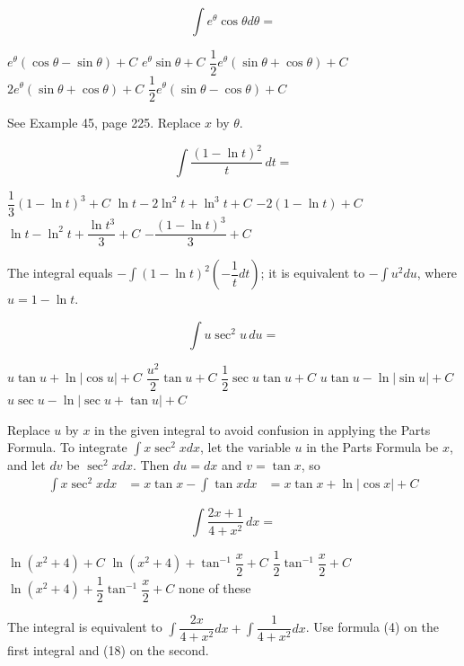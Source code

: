 \question\label{calc05:bc-first}
\[
\displaystyle\int e^{\theta} \cos \theta d \theta=
\]
\begin{choices}
  \choice $e^{\theta}(\cos \theta-\sin \theta)+C$
  \choice $e^{\theta} \sin \theta+C$
  \CorrectChoice $\dfrac{1}{2} e^{\theta}(\sin \theta+\cos \theta)+C$
  \choice $2 e^{\theta}(\sin \theta+\cos \theta)+C$
  \choice $\dfrac{1}{2} e^{\theta}(\sin \theta-\cos \theta)+C$
\end{choices}
\begin{solution}
See Example 45, page 225. Replace $x$ by $\theta$.
\end{solution}

\question
\[
\displaystyle\int \dfrac{(1-\ln t)^{2}}{t} \,dt=
\]
\begin{choices}
  \choice $\dfrac{1}{3}(1-\ln t)^{3}+C$
  \choice $\ln t-2 \ln ^{2} t+\ln ^{3} t+C$
  \choice $-2(1-\ln t)+C$
  \choice $\ln t-\ln ^{2} t+\dfrac{\ln t^{3}}{3}+C$
  \CorrectChoice $-\dfrac{(1-\ln t)^{3}}{3}+C$
\end{choices}
\begin{solution}
The integral equals $-\displaystyle\int(1-\ln t)^{2}\left(-\dfrac{1}{t} d t\right)$; it is equivalent to $-\displaystyle\int u^{2} d u$, where $u=1-\ln t$.
\end{solution}

\question
\[
\displaystyle\int u \sec ^{2} u \,du=
\]
\begin{choices}
  \CorrectChoice $u \tan u+\ln |\cos u|+C$
  \choice $\dfrac{u^{2}}{2} \tan u+C$
  \choice $\dfrac{1}{2} \sec u \tan u+C$
  \choice $u \tan u-\ln |\sin u|+C$
  \choice $u \sec u-\ln |\sec u+\tan u|+C$
\end{choices}
\begin{solution}
Replace $u$ by $x$ in the given integral to avoid confusion in applying the Parts Formula. To integrate $\displaystyle\int x \sec ^{2} x d x$, let the variable $u$ in the Parts Formula be $x$, and let $d v$ be $\sec ^{2} x d x$. Then $d u=d x$ and $v=\tan x$, so
\[
\begin{aligned}
\displaystyle\int x \sec ^{2} x d x & =x \tan x-\displaystyle\int \tan x d x 
& =x \tan x+\ln |\cos x|+C
\end{aligned}
\]
\end{solution}



\newpage





\question
\[
\displaystyle\int \dfrac{2 x+1}{4+x^{2}} \,dx=
\]
\begin{choices}
  \choice $\ln \left(x^{2}+4\right)+C$
  \choice $\ln \left(x^{2}+4\right)+\tan ^{-1} \dfrac{x}{2}+C$
  \choice $\dfrac{1}{2} \tan ^{-1} \dfrac{x}{2}+C$
  \CorrectChoice $\ln \left(x^{2}+4\right)+\dfrac{1}{2} \tan ^{-1} \dfrac{x}{2}+C$
  \choice none of these
\end{choices}
\begin{solution}
The integral is equivalent to $\displaystyle\int \dfrac{2 x}{4+x^{2}} d x+\displaystyle\int \dfrac{1}{4+x^{2}} d x$. Use formula (4) on the first integral and (18) on the second.
\end{solution}

